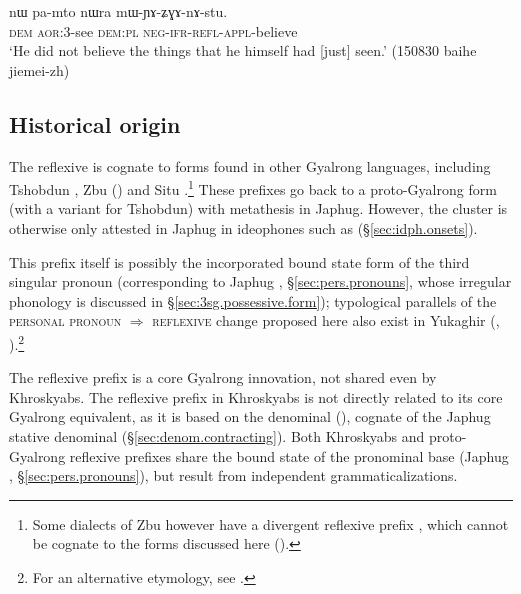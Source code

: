 \begin{exe}
\ex \label{ex:mWYAZGAnAstu}
\gll nɯ pa-mto nɯra mɯ-ɲɤ-ʑɣɤ-nɤ-stu.  \\
\textsc{dem} \textsc{aor}:3\flobv{}-see \textsc{dem}:\textsc{pl} \textsc{neg}-\textsc{ifr}-\textsc{refl}-\textsc{appl}-believe \\
\glt `He did not believe the things that he himself had [just] seen.' (150830 baihe jiemei-zh) 
\end{exe}

 
\subsection{Historical origin}  \label{sec:reflexive.origin}
The reflexive  is cognate to forms found in other Gyalrong languages, including Tshobdun  \citep{jackson14morpho}, Zbu  (\citealt[9]{gong18these}) and Situ .\footnote{Some dialects of Zbu however have a divergent reflexive prefix , which cannot be cognate to the forms discussed here (\citealt[9]{gong18these}). } These prefixes go back to a proto-Gyalrong form  (with a variant  for Tshobdun) with metathesis in Japhug. However, the cluster  is otherwise only attested in Japhug in ideophones such as  (§\ref{sec:idph.onsets}).

This prefix itself is possibly the incorporated bound state form of the third singular pronoun  (corresponding to Japhug , §\ref{sec:pers.pronouns}, whose irregular phonology is discussed in §\ref{sec:3sg.possessive.form}); typological parallels of the \textsc{personal pronoun} $\Rightarrow$ \textsc{reflexive} change proposed here also exist in Yukaghir (\citealt{jacques10refl}, \citealt[§5.2]{maslova07yukaghir}).\footnote{For an alternative etymology, see \citet{jackson14morpho}.}
 
The reflexive prefix is a core Gyalrong innovation, not shared even by Khroskyabs. The reflexive prefix  in Khroskyabs is not directly related to its core Gyalrong equivalent, as it is based on the denominal  (\citealt[300]{lai17khroskyabs}), cognate of the Japhug stative denominal  (§\ref{sec:denom.contracting}). Both Khroskyabs  and proto-Gyalrong  reflexive prefixes share the bound state of the pronominal base  (Japhug , §\ref{sec:pers.pronouns}), but result from independent grammaticalizations.

